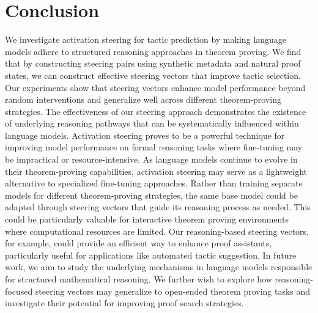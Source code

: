\section{Conclusion}
We investigate activation steering for tactic prediction by making language models adhere to structured reasoning approaches in theorem proving. We find that by constructing steering pairs using synthetic metadata and natural proof states, we can construct effective steering vectors that improve tactic selection. Our experiments show that steering vectors enhance model performance beyond random interventions and generalize well across different theorem-proving strategies. The effectiveness of our steering approach demonstrates the existence of underlying reasoning pathways that can be systematically influenced within language models. Activation steering proves to be a powerful technique for improving model performance on formal reasoning tasks where fine-tuning may be impractical or resource-intensive. As language models continue to evolve in their theorem-proving capabilities, activation steering may serve as a lightweight alternative to specialized fine-tuning approaches. Rather than training separate models for different theorem-proving strategies, the same base model could be adapted through steering vectors that guide its reasoning process as needed. This could be particularly valuable for interactive theorem proving environments where computational resources are limited. Our reasoning-based steering vectors, for example, could provide an efficient way to enhance proof assistants, particularly useful for applications like automated tactic suggestion. In future work, we aim to study the underlying mechanisms in language models responsible for structured mathematical reasoning. We further wish to explore how reasoning-focused steering vectors may generalize to open-ended theorem proving tasks and investigate their potential for improving proof search strategies.
